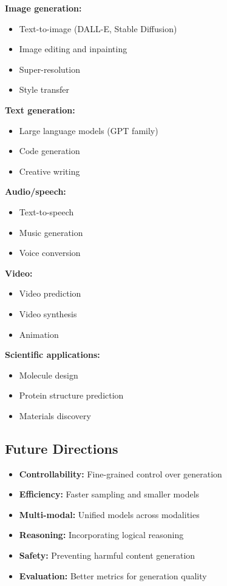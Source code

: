\textbf{Image generation:}
\begin{itemize}
    \item Text-to-image (DALL-E, Stable Diffusion)
    \item Image editing and inpainting
    \item Super-resolution
    \item Style transfer
\end{itemize}

\textbf{Text generation:}
\begin{itemize}
    \item Large language models (GPT family)
    \item Code generation
    \item Creative writing
\end{itemize}

\textbf{Audio/speech:}
\begin{itemize}
    \item Text-to-speech
    \item Music generation
    \item Voice conversion
\end{itemize}

\textbf{Video:}
\begin{itemize}
    \item Video prediction
    \item Video synthesis
    \item Animation
\end{itemize}

\textbf{Scientific applications:}
\begin{itemize}
    \item Molecule design
    \item Protein structure prediction
    \item Materials discovery
\end{itemize}

\subsection{Future Directions}

\begin{itemize}
    \item \textbf{Controllability:} Fine-grained control over generation
    \item \textbf{Efficiency:} Faster sampling and smaller models
    \item \textbf{Multi-modal:} Unified models across modalities
    \item \textbf{Reasoning:} Incorporating logical reasoning
    \item \textbf{Safety:} Preventing harmful content generation
    \item \textbf{Evaluation:} Better metrics for generation quality
\end{itemize}

